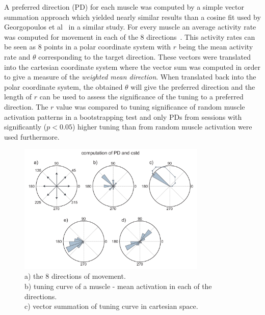 A preferred direction (PD) for each muscle was computed by a simple vector summation approach which yielded nearly similar results than a cosine fit used by Georgopoulos et al~\citet{Georgopoulos:1982p4165} in a similar study. For every muscle an average activity rate was computed for movement in each of the 8 directions~. This activity rates can be seen as 8 points in a polar coordinate system with $r$ being the mean activity rate and $\theta$ corresponding to the target direction. These vectors were translated into the cartesian coordinate system where the vector sum was computed in order to give a measure of the \emph{weighted mean direction}. When translated back into the polar coordinate system, the obtained $\theta$ will give the preferred direction and the length of $r$ can be used to assess the significance of the tuning to a preferred direction. The $r$ value was compared to tuning significance of random muscle activation patterns in a bootstrapping test and only PDs from sessions with significantly ($p < 0.05$) higher tuning than from random muscle activation were used furthermore.

\begin{figure}[ht]
	\centering
		\includegraphics[width=0.8\textwidth]{images/cstd_pd.pdf}
	\caption
	{
	a) the 8 directions of movement. \\
	b) tuning curve of a muscle - mean activation in each of the directions. \\
	c) vector summation of tuning curve in cartesian space. \\
	}
	\label{sg:fig:images_cstd_pd}
\end{figure}

